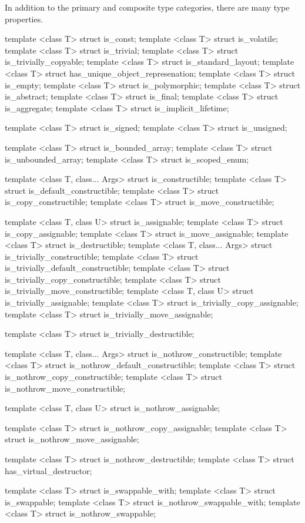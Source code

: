
In addition to the primary and composite type categories, there are many type properties.

\begin{cpp}
template <class T> struct is_const;
template <class T> struct is_volatile;
template <class T> struct is_trivial;
template <class T> struct is_trivially_copyable;
template <class T> struct is_standard_layout;
template <class T> struct has_unique_object_represenation;
template <class T> struct is_empty;
template <class T> struct is_polymorphic;
template <class T> struct is_abstract;
template <class T> struct is_final;
template <class T> struct is_aggregate;
template <class T> struct is_implicit_lifetime;

template <class T> struct is_signed;
template <class T> struct is_unsigned;

template <class T> struct is_bounded_array;
template <class T> struct is_unbounded_array;
template <class T> struct is_scoped_enum;

template <class T, class... Args> struct is_constructible;
template <class T> struct is_default_constructible;
template <class T> struct is_copy_constructible;
template <class T> struct is_move_constructible;

template <class T, class U> struct is_assignable;
template <class T> struct is_copy_assignable;
template <class T> struct is_move_assignable;
template <class T> struct is_destructible;
template <class T, class... Args> struct is_trivially_constructible;
template <class T> struct is_trivially_default_constructible;
template <class T> struct is_trivially_copy_constructible;
template <class T> struct is_trivially_move_constructible;
template <class T, class U> struct is_trivially_assignable;
template <class T> struct is_trivially_copy_assignable;
template <class T> struct is_trivially_move_assignable;

template <class T> struct is_trivially_destructible;

template <class T, class... Args> struct is_nothrow_constructible;
template <class T> struct is_nothrow_default_constructible;
template <class T> struct is_nothrow_copy_constructible;
template <class T> struct is_nothrow_move_constructible;

template <class T, class U> struct is_nothrow_assignable;

template <class T> struct is_nothrow_copy_assignable;
template <class T> struct is_nothrow_move_assignable;

template <class T> struct is_nothrow_destructible;
template <class T> struct has_virtual_destructor;

template <class T> struct is_swappable_with;
template <class T> struct is_swappable;
template <class T> struct is_nothrow_swappable_with;
template <class T> struct is_nothrow_swappable;
\end{cpp}

